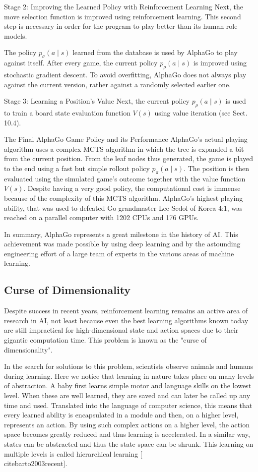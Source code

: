 \documentclass[10pt]{book}
\begin{document}
Stage 2: Improving the Learned Policy with Reinforcement Learning Next, the move selection function is improved using reinforcement learning. This second step is necessary in order for the program to play better than its human role models.

The policy $p_{\sigma}(a \mid s)$ learned from the database is used by AlphaGo to play against itself. After every game, the current policy $p_{\rho}(a \mid s)$ is improved using stochastic gradient descent. To avoid overfitting, AlphaGo does not always play against the current version, rather against a randomly selected earlier one.

Stage 3: Learning a Position's Value Next, the current policy $p_{\rho}(a \mid s)$ is used to train a board state evaluation function $V(s)$ using value iteration (see Sect. 10.4).

The Final AlphaGo Game Policy and its Performance AlphaGo's actual playing algorithm uses a complex MCTS algorithm in which the tree is expanded a bit from the current position. From the leaf nodes thus generated, the game is played to the end using a fast but simple rollout policy $p_{\pi}(a \mid s)$. The position is then evaluated using the simulated game's outcome together with the value function $V(s)$. Despite having a very good policy, the computational cost is immense because of the complexity of this MCTS algorithm. AlphaGo's highest playing ability, that was used to defeated Go grandmaster Lee Sedol of Korea 4:1, was reached on a parallel computer with 1202 CPUs and 176 GPUs.

In summary, AlphaGo represents a great milestone in the history of AI. This achievement was made possible by using deep learning and by the astounding engineering effort of a large team of experts in the various areas of machine learning.

\subsection*{Curse of Dimensionality}
Despite success in recent years, reinforcement learning remains an active area of research in AI, not least because even the best learning algorithms known today are still impractical for high-dimensional state and action spaces due to their gigantic computation time. This problem is known as the "curse of dimensionality".

In the search for solutions to this problem, scientists observe animals and humans during learning. Here we notice that learning in nature takes place on many levels of abstraction. A baby first learns simple motor and language skills on the lowest level. When these are well learned, they are saved and can later be called up any time and used. Translated into the language of computer science, this means that every learned ability is encapsulated in a module and then, on a higher level, represents an action. By using such complex actions on a higher level, the action space becomes greatly reduced and thus learning is accelerated. In a similar way, states can be abstracted and thus the state space can be shrunk. This learning on multiple levels is called hierarchical learning [\\cite{barto2003recent}].
\end{document}
